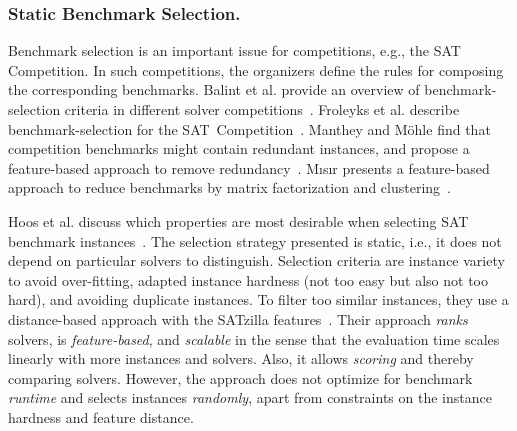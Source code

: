\documentclass[runningheads]{llncs}
\begin{document}
\subsubsection{Static Benchmark Selection.}

Benchmark selection is an important issue for competitions, e.g., the SAT Competition.
In such competitions, the organizers define the rules for composing the corresponding benchmarks.
Balint et al. provide an overview of benchmark-selection criteria in different solver competitions~\cite{balint2015overview}.
Froleyks et al. describe benchmark-selection for the SAT~Competition~\cite{FroleyksHIJS21}.
Manthey and Möhle find that competition benchmarks might contain redundant instances, and propose a feature-based approach to remove redundancy~\cite{manthey2016better}.
M{\i}s{\i}r presents a feature-based approach to reduce benchmarks by matrix factorization and clustering~\cite{misir2021benchmark}.

Hoos et al. discuss which properties are most desirable when selecting SAT benchmark instances~\cite{HoosKSS13}.
The selection strategy presented is static, i.e., it does not depend on particular solvers to distinguish.
Selection criteria are instance variety to avoid over-fitting, adapted instance hardness (not too easy but also not too hard), and avoiding duplicate instances.
To filter too similar instances, they use a distance-based approach with the SATzilla features~\cite{XuHHL08,features}.
Their approach \emph{ranks} solvers, is \emph{feature-based}, and \emph{scalable} in the sense that the evaluation time scales linearly with more instances and solvers.
Also, it allows \emph{scoring} and thereby comparing solvers.
However, the approach does not optimize for benchmark \emph{runtime} and selects instances \emph{randomly}, apart from constraints on the instance hardness and feature distance.
\end{document}
